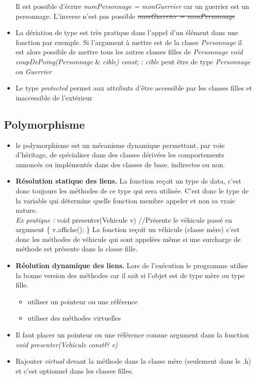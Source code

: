\documentclass[12pt,a4paper]{article}
\begin{document}
\begin{itemize}
\newline Il est possible d'écrire \textit{monPersonnage = monGuerrier} car un guerrier est un personnage. L'inverse n'est pas possible \sout{\textit{monGuerrier = monPersonnage}}
\item La dériation de type est très pratique dans l'appel d'un élément dans une fonction par exemple. Si l'argument à mettre est de la classe \textit{Personnage} il est alors possible de mettre tous les autres classes filles de \textit{Personnage}
\newline \textit{void coupDePoing(Personnage} \& \textit{cible) const;} : \textit{cible} peut être de type \textit{Personnage} ou \textit{Guerrier}
\item Le type \textit{protected} permet aux attributs d'être accessible par les classes filles et inaccessible de l'extérieur
\end{itemize}

\subsection{Polymorphisme}
\begin{itemize}
\item  le polymorphisme est un mécanisme dynamique permettant, par voie d'héritage, de spécialiser dans des classes dérivées les comportements annoncés ou implémentés dans des classes de base, indirectes ou non.
\item \textbf{Résolution statique des liens.} La fonction reçoit un type de data, c'est donc toujours les méthodes de ce type qui sera utilisée. C'est donc le type de la variable qui détermine quelle fonction membre appeler et non sa vraie nature.\\
\textit{Ex pratique : } 
\newline void presenter(Vehicule v)  //Présente le véhicule passé en argument
\newline \{  v.affiche(); \}
\newline La fonction reçoit un véhicule (classe mère) c’est donc les méthodes de véhicule qui sont appelées même si une surcharge de méthode est présente dans la classe fille.
\item \textbf{Réolution dynamique des liens.} Lors de l'exécution le programme utilise la bonne version des méthodes car il sait si l'objet est de type mère ou type fille.
\begin{itemize}
\item utiliser un pointeur ou une référence
\item utiliser des méthodes virtuelles
\end{itemize}
\item Il faut placer un pointeur ou une référence comme argument dans la fonction \textit{void presenter(Vehicule const\& v)}
\item Rajouter \textit{virtual} devant la méthode dans la classe mère (seulement dans le .h) et c’est optionnel dans les classes filles.
\end{itemize}
\end{document}

